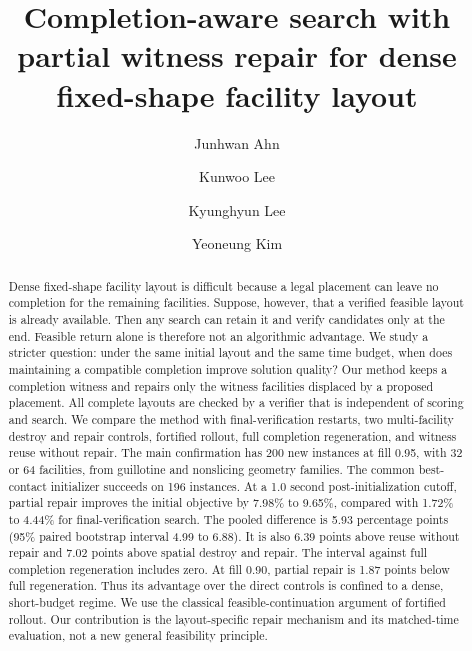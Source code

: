 \documentclass[preprint,12pt,authoryear]{elsarticle}
\begin{document}
\begin{frontmatter}

\title{Completion-aware search with partial witness repair for dense
fixed-shape facility layout}

\author[inst1,fn1]{Junhwan Ahn}
\author[inst1,fn1]{Kunwoo Lee}
\author[inst2]{Kyunghyun Lee}
\author[inst3]{Yeoneung Kim}



\begin{abstract}
Dense fixed-shape facility layout is difficult because a legal placement can
leave no completion for the remaining facilities. Suppose, however, that a
verified feasible layout is already available. Then any search can retain it and
verify candidates only at the end. Feasible return alone is therefore not an
algorithmic advantage. We study a stricter question: under the same initial
layout and the same time budget, when does maintaining a compatible completion
improve solution quality? Our method keeps a completion witness and repairs only
the witness facilities displaced by a proposed placement. All complete layouts
are checked by a verifier that is independent of scoring and search. We compare
the method with final-verification restarts, two multi-facility destroy and
repair controls, fortified rollout, full completion regeneration, and witness
reuse without repair. The main confirmation has
200 new instances at fill 0.95, with 32 or 64 facilities, from guillotine and
nonslicing geometry families. The common best-contact initializer succeeds on
196 instances. At a 1.0 second post-initialization cutoff, partial repair improves
the initial objective by 7.98\% to 9.65\%, compared with 1.72\% to 4.44\% for
final-verification search. The pooled difference is 5.93 percentage points
(95\% paired bootstrap interval 4.99 to 6.88). It is also 6.39 points above
reuse without repair and 7.02 points above spatial destroy and repair. The
interval against full completion regeneration includes zero. At fill 0.90,
partial repair is 1.87 points below full regeneration. Thus its advantage over
the direct controls is confined to a dense, short-budget regime. We use the
classical feasible-continuation argument of fortified rollout. Our contribution
is the layout-specific repair mechanism and its matched-time evaluation, not a
new general feasibility principle.
\end{abstract}


\end{frontmatter}
\end{document}

